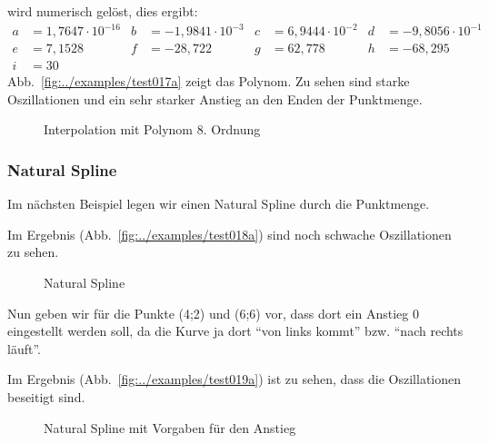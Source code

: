 \documentclass[ngerman,origlongtable]{scrartcl}
\newcommand{\includepgfimage}[2]{%
\begin{figure}%
{\centering%
\caption{#2}\label{fig:#1}%
}%
\end{figure}%
}
\begin{document}
wird numerisch gelöst, dies ergibt:
\begin{align*}
a&=1,7647\cdot{}{10}^{-16}&b&=-1,9841\cdot{}{10}^{-3}&c&=6,9444\cdot{}{10}^{-2}&d&=-9,8056\cdot{}{10}^{-1}\\[0.2em]
e&=7,1528&f&=-28,722&g&=62,778&h&=-68,295\\[0.2em]
i&=30
\end{align*}
Abb.~\vref{fig:../examples/test017a} zeigt das Polynom. Zu sehen sind starke Oszillationen
und ein sehr starker Anstieg an den Enden der Punktmenge.
\clearpage
\includepgfimage{../examples/test017a}{Interpolation mit Polynom 8. Ordnung}
\clearpage
\subsubsection{Natural Spline}
Im nächsten Beispiel legen wir einen Natural Spline durch die Punktmenge.


Im Ergebnis (Abb.~\vref{fig:../examples/test018a}) sind noch schwache Oszillationen
zu sehen.
\clearpage
\includepgfimage{../examples/test018a}{Natural Spline}
\clearpage
Nun geben wir für die Punkte (4;2) und (6;6) vor, dass dort ein Anstieg
0 eingestellt werden soll, da die Kurve ja dort "`von links kommt"' bzw.
"`nach rechts läuft"'.

Im Ergebnis (Abb.~\vref{fig:../examples/test019a}) ist zu sehen, dass die Oszillationen
beseitigt sind.
\clearpage
\includepgfimage{../examples/test019a}{Natural Spline mit Vorgaben für den Anstieg}
\clearpage
\end{document}
